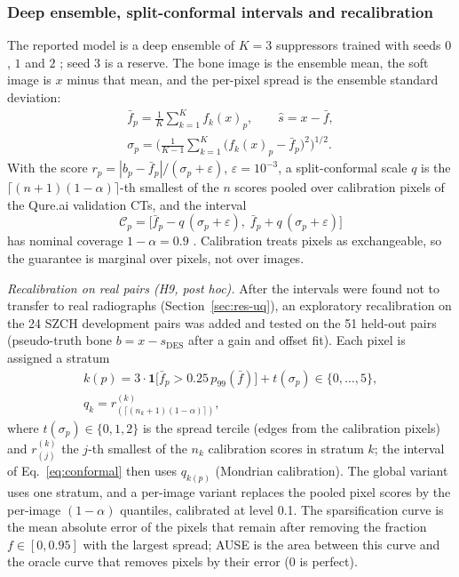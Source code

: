 \subsubsection{Deep ensemble, split-conformal intervals and recalibration}
\label{sec:m-ensemble}
The reported model is a deep ensemble of $K=3$ suppressors trained with seeds $0$, $1$ and $2$ \cite{lakshminarayanan2017ensembles}; seed
$3$ is a reserve. The bone image is the ensemble mean, the soft image is $x$ minus that mean, and the per-pixel spread is the ensemble
standard deviation:
\begin{equation}
\begin{gathered}
\bar f_p=\frac1K\sum_{k=1}^{K}f_k(x)_p,\qquad \hat s=x-\bar f,\\
\sigma_p=\Big(\frac{1}{K-1}\sum_{k=1}^{K}\big(f_k(x)_p-\bar f_p\big)^2\Big)^{1/2}.
\end{gathered}
\label{eq:ensemble}
\end{equation}
With the score $r_p=|b_p-\bar f_p|/(\sigma_p+\varepsilon)$, $\varepsilon=10^{-3}$, a split-conformal scale $q$ is the
$\lceil (n+1)(1-\alpha)\rceil$-th smallest of the $n$ scores pooled over calibration pixels of the Qure.ai validation CTs, and the
interval
\begin{equation}
\mathcal{C}_p=\big[\bar f_p-q\,(\sigma_p+\varepsilon),\;\bar f_p+q\,(\sigma_p+\varepsilon)\big]
\label{eq:conformal}
\end{equation}
has nominal coverage $1-\alpha=0.9$ \cite{lei2018conformal,angelopoulos2023conformal}. Calibration treats pixels as exchangeable, so the
guarantee is marginal over pixels, not over images.

\emph{Recalibration on real pairs (H9, post hoc).} After the intervals were found not to transfer to real radiographs
(Section~\ref{sec:res-uq}), an exploratory recalibration on the 24 SZCH development pairs was added and tested on the 51 held-out pairs
(pseudo-truth bone $b=x-s_{\mathrm{DES}}$ after a gain and offset fit). Each pixel is assigned a stratum
\begin{equation}
\begin{gathered}
k(p)=3\cdot\mathbf{1}\big[\bar f_p>0.25\,p_{99}(\bar f)\big]+t(\sigma_p)\in\{0,\dots,5\},\\
q_k=r^{(k)}_{(\lceil (n_k+1)(1-\alpha)\rceil)},
\end{gathered}
\label{eq:mondrian}
\end{equation}
where $t(\sigma_p)\in\{0,1,2\}$ is the spread tercile (edges from the calibration pixels) and $r^{(k)}_{(j)}$ the $j$-th smallest of the
$n_k$ calibration scores in stratum $k$; the interval of Eq.~\eqref{eq:conformal} then uses $q_{k(p)}$ (Mondrian calibration). The global
variant uses one stratum, and a per-image variant replaces the pooled pixel scores by the per-image $(1-\alpha)$ quantiles, calibrated at
level 0.1. The sparsification curve is the mean absolute error of the pixels that remain after removing the fraction $f\in[0,0.95]$ with
the largest spread; AUSE is the area between this curve and the oracle curve that removes pixels by their error (0 is perfect).

